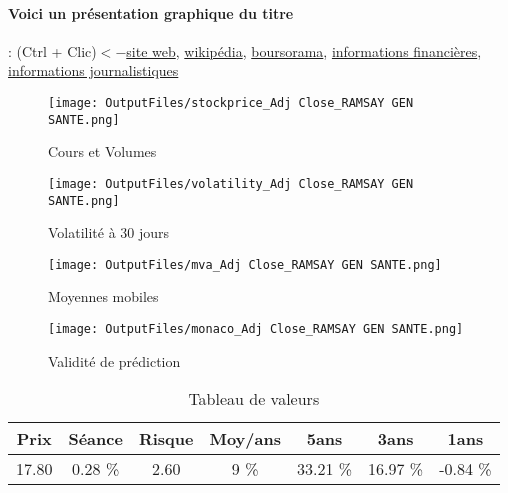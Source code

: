 \documentclass[11pt,a4paper]{report}%
\begin{document}
\paragraph{Voici un présentation graphique du titre} : (Ctrl + Clic)$<-$\href{https://ramsaygds.fr/finance}{site web}, \href{https://fr.wikipedia.org/wiki/Ramsay_Sant%C3%A9}{wikipédia}, \href{https://www.boursorama.com/cours/1rPGDS}{boursorama}, \href{https://www.qwant.com/?q=site:https:%2f%2fwww.easybourse.com%2faction-societe%2fRAMSAY-GEN-SANTE&t=web&client=ext-firefox-hp}{informations financières}, \href{https://bourse.lerevenu.com/cours-de-bourse/fiche-valeur-synthese/RAMSAY-GEN-SANTE/GDS-FR}{informations journalistiques}
\begin{figure}[!htb]
   \begin{minipage}{0.5\textwidth}
     \centering
     \texttt{[image: OutputFiles/stockprice\_Adj Close\_RAMSAY GEN SANTE.png]}
     \caption{Cours et Volumes}\label{Fig:price_RAMSAY GEN SANTE}
   \end{minipage}\hfill
   \begin{minipage}{0.5\textwidth}
     \centering
     \texttt{[image: OutputFiles/volatility\_Adj Close\_RAMSAY GEN SANTE.png]}
     \caption{Volatilité à 30 jours}\label{Fig:volat_RAMSAY GEN SANTE}
   \end{minipage}
\end{figure}
\begin{figure}[!htb]
   \begin{minipage}{0.5\textwidth}
     \centering
     \texttt{[image: OutputFiles/mva\_Adj Close\_RAMSAY GEN SANTE.png]}
     \caption{Moyennes mobiles}\label{Fig:mva_RAMSAY GEN SANTE}
   \end{minipage}\hfill
   \begin{minipage}{0.5\textwidth}
     \centering
     \texttt{[image: OutputFiles/monaco\_Adj Close\_RAMSAY GEN SANTE.png]}
     \caption{Validité de prédiction}\label{Fig:prediction_RAMSAY GEN SANTE}
   \end{minipage}
\end{figure}

\begin{table}[H]
  \centering
    \begin{tabular}{|c|c|c|c|c|c|c|}
    \hline
    Prix & Séance & Risque  & Moy/ans & 5ans & 3ans & 1ans \\
    \hline
    17.80 &    0.28 \%    & 2.60 & 9 \% & 33.21 \% & 16.97 \% & -0.84 \% \\
    \hline
    \end{tabular}%
        \label{tab:table_RAMSAY GEN SANTE}%
      \caption{Tableau de valeurs}
\end{table}%
\end{document}
